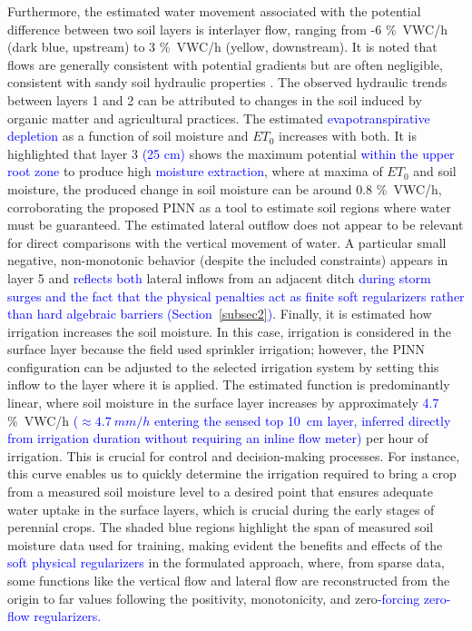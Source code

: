 \documentclass[pdflatex,sn-nature]{sn-jnl}%
\theoremstyle{thmstyleone}%
\theoremstyle{thmstyletwo}%
\theoremstyle{thmstylethree}%
\begin{document}
Furthermore, the estimated water movement associated with the potential difference between two soil layers is interlayer flow, ranging from -6 \si{\% VWC/h} (dark blue, upstream) to 3 \si{\%VWC/h} (yellow, downstream). It is noted that flows are generally consistent with potential gradients but are often negligible, consistent with sandy soil hydraulic properties \cite{Reyes2016}. The observed hydraulic trends between layers 1 and 2 can be attributed to changes in the soil induced by organic matter and agricultural practices.
The estimated \textcolor{blue}{evapotranspirative depletion} as a function of soil moisture and $ET_0$ increases with both. It is highlighted that layer 3 \textcolor{blue}{(25 \si{cm})} shows the maximum potential \textcolor{blue}{within the upper root zone} to produce high \textcolor{blue}{moisture extraction}, where at maxima of $ET_0$ and soil moisture, the produced change in soil moisture can be around 0.8 \si{\%VWC/h}, corroborating the proposed PINN as a tool to estimate soil regions where water must be guaranteed.
The estimated lateral outflow does not appear to be relevant for direct comparisons with the vertical movement of water. A particular small negative, non-monotonic behavior (despite the included constraints) appears in layer 5 and \textcolor{blue}{reflects both} lateral inflows from an adjacent ditch \textcolor{blue}{during storm surges and the fact that the physical penalties act as finite soft regularizers rather than hard algebraic barriers (Section~\ref{subsec2})}.
Finally, it is estimated how irrigation increases the soil moisture. In this case, irrigation is considered in the surface layer because the field used sprinkler irrigation; however, the PINN configuration can be adjusted to the selected irrigation system by setting this inflow to the layer where it is applied. The estimated function is predominantly linear, where soil moisture in the surface layer increases by approximately \textcolor{blue}{4.7} \si{\%VWC/h} \textcolor{blue}{($\approx\SI{4.7}{mm/h}$ entering the sensed top \SI{10}{cm} layer, inferred directly from irrigation duration without requiring an inline flow meter)} per hour of irrigation. This is crucial for control and decision-making processes. For instance, this curve enables us to quickly determine the irrigation required to bring a crop from a measured soil moisture level to a desired point that ensures adequate water uptake in the surface layers, which is crucial during the early stages of perennial crops.
The shaded blue regions highlight the span of measured soil moisture data used for training, making evident the benefits and effects of the \textcolor{blue}{soft physical regularizers} in the formulated approach, where, from sparse data, some functions like the vertical flow and lateral flow are reconstructed from the origin to far values following the positivity, monotonicity, and zero\textcolor{blue}{-forcing zero-flow regularizers.}
\end{document}
